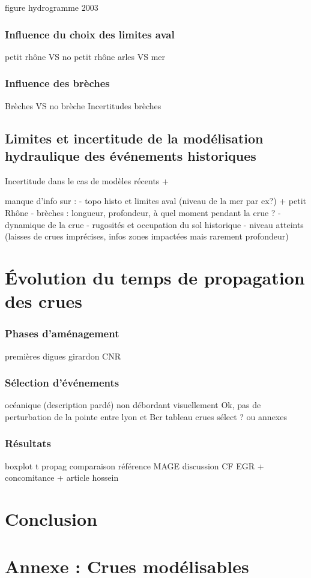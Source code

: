 \documentclass[11pt]{article}
\begin{document}
	figure hydrogramme 2003
	
		\subsubsection{Influence du choix des limites aval}
		petit rhône VS no petit rhône
		arles VS mer
		
		
		\subsubsection{Influence des brèches}
		Brèches VS no brèche
		Incertitudes brèches
		
	\subsection{Limites et incertitude de la modélisation hydraulique des événements historiques}
Incertitude dans le cas de modèles récents +	
	
	manque d'info sur : 
	- topo histo et limites aval (niveau de la mer par ex?) + petit Rhône
	- brèches : longueur, profondeur, à quel moment pendant la crue ? 
	- dynamique de la crue
	- rugosités et occupation du sol historique
	- niveau atteints (laisses de crues imprécises, infos zones impactées mais rarement profondeur)
	

\section{Évolution du temps de propagation des crues}
	
	\subsubsection{Phases d'aménagement}
		premières digues
		girardon
		CNR
		
	\subsubsection{Sélection d'événements}
	océanique (description pardé)
	non débordant
	visuellement Ok, pas de perturbation de la pointe entre lyon et Bcr
	tableau crues sélect ? ou annexes
	
	\subsubsection{Résultats}
	boxplot t propag
	comparaison référence MAGE
	discussion CF EGR + concomitance + article hossein

\section{Conclusion}

\section{Annexe : Crues modélisables}



\printbibliography
\end{document}
